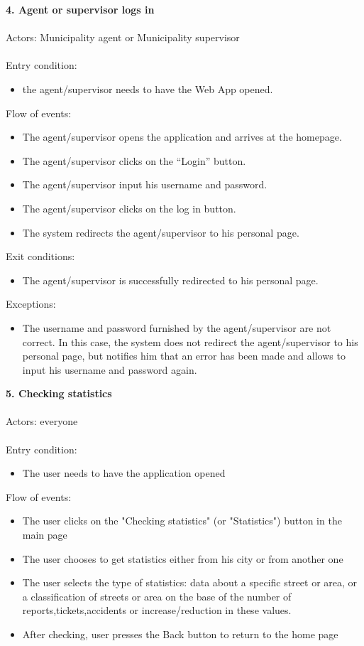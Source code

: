 \documentclass[a4paper]{report}
\begin{document}
\textbf{4. Agent or supervisor logs in }\label{uc:4}
\\
\\
Actors: Municipality agent or Municipality supervisor \\ \\
Entry condition:
\begin{itemize}
\item the agent/supervisor needs to have the Web App opened.
\end{itemize}
Flow of events:
\begin{itemize}
\item The agent/supervisor opens the application and arrives at the homepage.
\item The agent/supervisor clicks on the “Login” button.
\item The agent/supervisor input his username and password.
\item	The agent/supervisor clicks on the log in button.
\item	The system redirects the agent/supervisor to his personal page.
\end{itemize}
Exit conditions:
\begin{itemize}
\item The agent/supervisor is successfully redirected to his personal page.
 \end{itemize}
Exceptions: 
 \begin{itemize}
 \item The username and password furnished by the agent/supervisor are not correct. In this case, the system does not redirect the agent/supervisor to his personal page, but notifies him that an error has been made and allows to input his username and password again.
\end{itemize}
\textbf{5. Checking statistics}\label{uc:5}
\\ \\
Actors: everyone \\ \\
Entry condition: 
\begin{itemize}
\item The user needs to have the application opened
\end{itemize}
Flow of events:
\begin{itemize}
\item The user clicks on the "Checking statistics" (or "Statistics") button in the main page
\item The user chooses to get statistics either from his city or from another one
\item The user selects the type of statistics: data about a specific street or area, or a classification of streets or area on the base of the number of reports,tickets,accidents or increase/reduction in these values.
\item After checking, user presses the Back button to return to the home page
\end{itemize}
\end{document}
